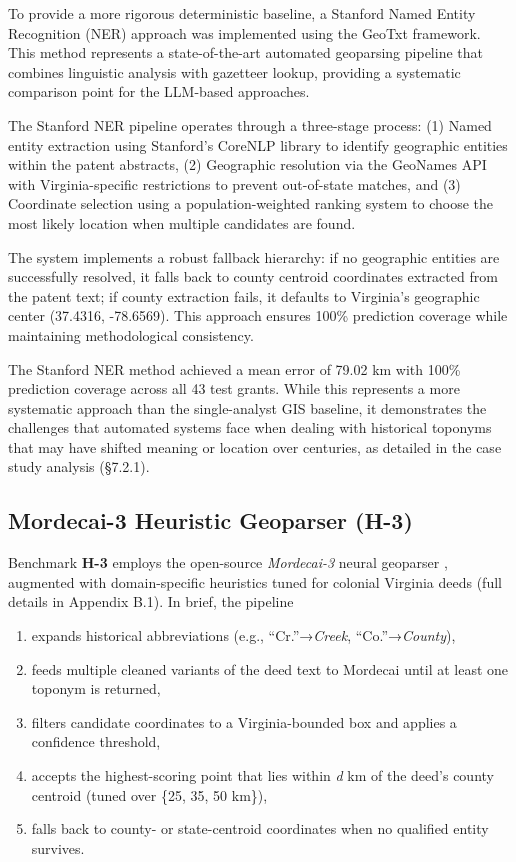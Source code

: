 To provide a more rigorous deterministic baseline, a Stanford Named
Entity Recognition (NER) approach was implemented using the GeoTxt
framework. This method represents a state-of-the-art automated
geoparsing pipeline that combines linguistic analysis with gazetteer
lookup, providing a systematic comparison point for the LLM-based
approaches.

The Stanford NER pipeline operates through a three-stage process: (1)
Named entity extraction using Stanford's CoreNLP library to identify
geographic entities within the patent abstracts, (2) Geographic
resolution via the GeoNames API with Virginia-specific restrictions to
prevent out-of-state matches, and (3) Coordinate selection using a
population-weighted ranking system to choose the most likely location
when multiple candidates are found.

The system implements a robust fallback hierarchy: if no geographic
entities are successfully resolved, it falls back to county centroid
coordinates extracted from the patent text; if county extraction fails,
it defaults to Virginia's geographic center (37.4316, -78.6569). This
approach ensures 100\% prediction coverage while maintaining
methodological consistency.

The Stanford NER method achieved a mean error of 79.02 km with 100\%
prediction coverage across all 43 test grants. While this represents a
more systematic approach than the single-analyst GIS baseline, it
demonstrates the challenges that automated systems face when dealing
with historical toponyms that may have shifted meaning or location over
centuries, as detailed in the case study analysis (§7.2.1).

\subsection{Mordecai-3 Heuristic Geoparser
(H-3)}\label{mordecai-3-heuristic-geoparser-h-3}

Benchmark \textbf{H-3} employs the open-source \emph{Mordecai-3} neural
geoparser \citep{halterman2023mordecai}, augmented with domain-specific
heuristics tuned for colonial Virginia deeds (full details in Appendix
B.1). In brief, the pipeline

\begin{enumerate}
\def\labelenumi{\arabic{enumi}.}
\tightlist
\item
  expands historical abbreviations (e.g., ``Cr.''→\emph{Creek},
  ``Co.''→\emph{County}),
\item
  feeds multiple cleaned variants of the deed text to Mordecai until at
  least one toponym is returned,
\item
  filters candidate coordinates to a Virginia-bounded box and applies a
  confidence threshold,
\item
  accepts the highest-scoring point that lies within \emph{d} km of the
  deed's county centroid (tuned over \{25, 35, 50 km\}),
\item
  falls back to county- or state-centroid coordinates when no qualified
  entity survives.
\end{enumerate}

